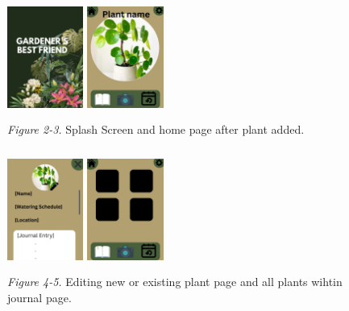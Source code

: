 \documentclass{sigchi}
\begin{document}
\begin{figure}[H]
    \centering
    \includegraphics[width=2.5cm, height=4cm]{Load Screen}
    \includegraphics[width=2.5cm, height=4cm]{HomePlantAdded}
	\\\emph{Figure 2-3.} Splash Screen and home page after plant added.
\end{figure}

\begin{figure}[H]
    \centering
    \includegraphics[width=2.5cm, height=4cm]{NewPlantOrEditExisting}
    \includegraphics[width=2.5cm, height=4cm]{AllPlants}
	\\\emph{Figure 4-5.} Editing new or existing plant page and all plants wihtin journal page.
\end{figure}
\end{document}

